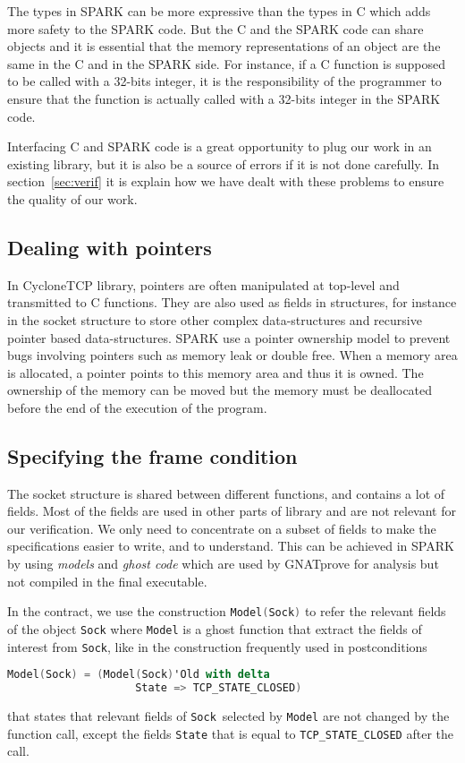 \documentclass[conference]{IEEEtran}
\def\spark#1{\lstinline[language=Ada]{#1}}
\begin{document}
The types in SPARK can be more expressive than the types in C which adds more
safety to the SPARK code.
But the C and the SPARK code can share objects and it is essential that the
memory representations of an object are the same in the C and in the SPARK side.
For instance, if a C function is supposed to be called with a 32-bits integer,
it is the responsibility of the programmer to ensure that the function is
actually called with a 32-bits integer in the SPARK code.

Interfacing C and SPARK code is a great opportunity to plug our work in an
existing library, but it is also be a source of errors if it is not done
carefully. In section~\ref{sec:verif} it is explain how we have dealt with these
problems to ensure the quality of our work.

\subsection{Dealing with pointers}
\label{sec:pointers}

In CycloneTCP library, pointers are often manipulated at top-level and transmitted
to C functions. They are also used as fields in structures, for instance in
the socket structure to store other complex data-structures and recursive pointer
based data-structures. SPARK use a pointer ownership model to prevent bugs
involving pointers such as memory leak or double free. When a memory area is
allocated, a pointer points to this memory area and thus it is owned.
The ownership of the memory can be moved but the memory must be deallocated
before the end of the execution of the program.

\subsection{Specifying the frame condition}

The socket structure is shared between different functions, and contains a lot
of fields. Most of the fields are used in other parts of library and are not
relevant for our verification. We only need to concentrate on a subset of fields
to make the specifications easier to write, and to understand.
This can be achieved in SPARK by using \emph{models} and \emph{ghost code}
which are used by GNATprove for analysis but not compiled in the final executable.

In the contract, we use the construction \spark{Model(Sock)} to refer the
relevant fields of the object \spark{Sock} where
\spark{Model} is a ghost function that extract the fields of interest from
\spark{Sock}, like in the construction frequently used in postconditions
\begin{lstlisting}[language=Ada, basicstyle=\small\ttfamily]
Model(Sock) = (Model(Sock)'Old with delta
                    State => TCP_STATE_CLOSED)
\end{lstlisting}
that states that relevant fields of \spark{Sock} selected by \spark{Model} are
not changed by the function call, except the fields \spark{State} that is equal
to \spark{TCP_STATE_CLOSED} after the call.
\end{document}
